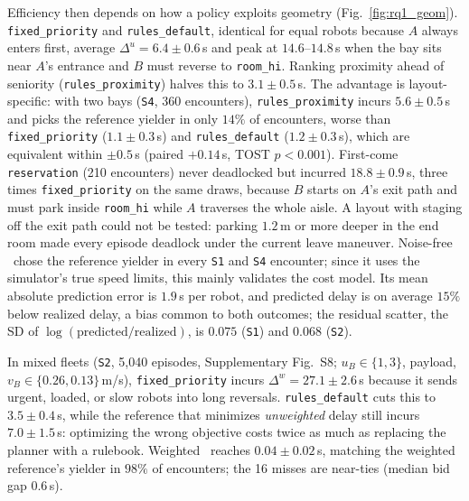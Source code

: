 Efficiency then depends on how a policy exploits geometry (Fig.~\ref{fig:rq1_geom}). \texttt{fixed\_priority} and \texttt{rules\_default}, identical for equal robots because $A$ always enters first, average $\Delta^{u}=6.4\pm 0.6$\,s and peak at $14.6$--$14.8$\,s when the bay sits near $A$'s entrance and $B$ must reverse to \texttt{room\_hi}. Ranking proximity ahead of seniority (\texttt{rules\_proximity}) halves this to $3.1\pm 0.5$\,s. The advantage is layout-specific: with two bays (\texttt{S4}, 360 encounters), \texttt{rules\_proximity} incurs $5.6\pm 0.5$\,s and picks the reference yielder in only $14\%$ of encounters, worse than \texttt{fixed\_priority} ($1.1\pm 0.3$\,s) and \texttt{rules\_default} ($1.2\pm 0.3$\,s), which are equivalent within $\pm0.5$\,s (paired $+0.14$\,s, TOST $p<0.001$). First-come \texttt{reservation} (210 encounters) never deadlocked but incurred $18.8\pm 0.9$\,s, three times \texttt{fixed\_priority} on the same draws, because $B$ starts on $A$'s exit path and must park inside \texttt{room\_hi} while $A$ traverses the whole aisle. A layout with staging off the exit path could not be tested: parking $1.2$\,m or more deeper in the end room made every episode deadlock under the current leave maneuver. Noise-free \cb\ chose the reference yielder in every \texttt{S1} and \texttt{S4} encounter; since it uses the simulator's true speed limits, this mainly validates the cost model. Its mean absolute prediction error is $1.9$\,s per robot, and predicted delay is on average $15\%$ below realized delay, a bias common to both outcomes; the residual scatter, the SD of $\log(\text{predicted}/\text{realized})$, is $0.075$ (\texttt{S1}) and $0.068$ (\texttt{S2}).

In mixed fleets (\texttt{S2}, 5,040 episodes, Supplementary Fig.~S8; $u_B\in\{1,3\}$, payload, $v_B\in\{0.26,0.13\}$\,m/s), \texttt{fixed\_priority} incurs $\Delta^{w}=27.1\pm 2.6$\,s because it sends urgent, loaded, or slow robots into long reversals. \texttt{rules\_default} cuts this to $3.5\pm 0.4$\,s, while the reference that minimizes \emph{unweighted} delay still incurs $7.0\pm 1.5$\,s: optimizing the wrong objective costs twice as much as replacing the planner with a rulebook. Weighted \cb\ reaches $0.04\pm 0.02$\,s, matching the weighted reference's yielder in $98\%$ of encounters; the 16 misses are near-ties (median bid gap $0.6$\,s).

